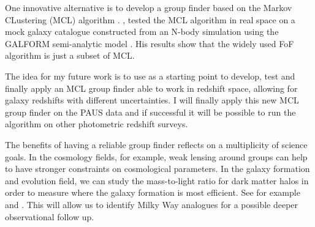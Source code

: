 \documentclass[11pt]{article}
\begin{document}
One innovative alternative is to develop a group finder based on the Markov CLustering (MCL) algorithm \citep{dongen00}. \cite{stothert18_thesis}, tested the MCL algorithm in real space on a mock galaxy catalogue constructed from an N-body simulation using the GALFORM semi-analytic model \citep{gonzalez14}. His results show that the widely used FoF algorithm is just a subset of MCL. 

The idea for my future work is to use \cite{stothert18_thesis} as a starting point to develop, test and finally apply an MCL group finder able to work in redshift space, allowing for galaxy redshifts with different uncertainties. I will finally apply this new MCL group finder on the PAUS data and if successful it will be possible to run the algorithm on other photometric redshift surveys.

The benefits of having a reliable group finder reflects on a multiplicity of science goals. In the cosmology fields, for example, weak lensing around groups can help to have stronger constraints on cosmological parameters. 
In the galaxy formation and evolution field, we can study the mass-to-light ratio for dark matter halos in order to measure where the galaxy formation is most efficient. See for example \cite{eke04} and \cite{viola15}. This will allow us to identify Milky Way analogues for a possible deeper observational follow up. 


\end{document}
